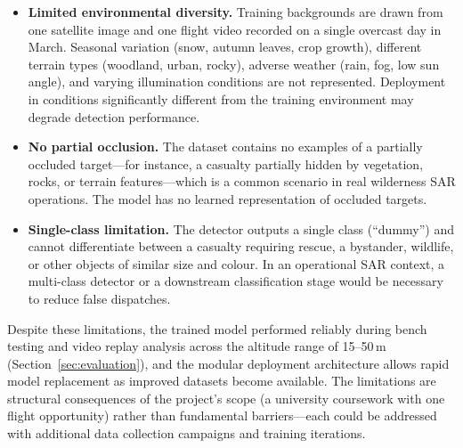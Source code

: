 \begin{itemize}
    \item \textbf{Limited environmental diversity.} Training backgrounds are drawn from one satellite image and one flight video recorded on a single overcast day in March. Seasonal variation (snow, autumn leaves, crop growth), different terrain types (woodland, urban, rocky), adverse weather (rain, fog, low sun angle), and varying illumination conditions are not represented. Deployment in conditions significantly different from the training environment may degrade detection performance.

    \item \textbf{No partial occlusion.} The dataset contains no examples of a partially occluded target---for instance, a casualty partially hidden by vegetation, rocks, or terrain features---which is a common scenario in real wilderness SAR operations. The model has no learned representation of occluded targets.

    \item \textbf{Single-class limitation.} The detector outputs a single class (``dummy'') and cannot differentiate between a casualty requiring rescue, a bystander, wildlife, or other objects of similar size and colour. In an operational SAR context, a multi-class detector or a downstream classification stage would be necessary to reduce false dispatches.
\end{itemize}

Despite these limitations, the trained model performed reliably during bench testing and video replay analysis across the altitude range of 15--50\,m (Section~\ref{sec:evaluation}), and the modular deployment architecture allows rapid model replacement as improved datasets become available. The limitations are structural consequences of the project's scope (a university coursework with one flight opportunity) rather than fundamental barriers---each could be addressed with additional data collection campaigns and training iterations.
